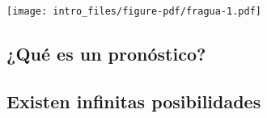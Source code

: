 \documentclass[
  letterpaper,
  DIV=11,
  numbers=noendperiod]{scrartcl}
\begin{document}
\texttt{[image: intro\_files/figure-pdf/fragua-1.pdf]}

\subsection{¿Qué es un pronóstico?}\label{quuxe9-es-un-pronuxf3stico}

\subsection{}\label{section-3}

\subsection{}\label{section-4}

\subsection{}\label{section-5}

\subsection{Existen infinitas
posibilidades}\label{existen-infinitas-posibilidades}
\end{document}
